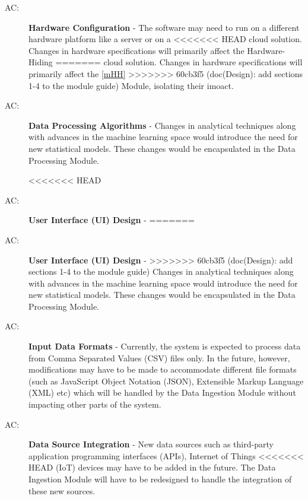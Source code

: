 \documentclass[12pt, titlepage]{article}
\newcounter{acnum}
\newcommand{\actheacnum}{AC\theacnum}
\begin{document}
\begin{description}
  \item[ \actheacnum \label{acHardware}:] \textbf{Hardware Configuration} - 
  The software may need to run on a different hardware platform like a server or on a 
<<<<<<< HEAD
  cloud solution. Changes in hardware specifications will primarily affect the Hardware-Hiding 
=======
  cloud solution. Changes in hardware specifications will primarily affect the \ref{mHH} 
>>>>>>> 60cb3f5 (doc(Design): add sections 1-4 to the module guide)
  Module, isolating their imoact.
  
  \item[ \actheacnum \label{acProcessing}:] \textbf{Data Processing Algorithms} - 
  Changes in analytical techniques along with advances in the machine learning space would
  introduce the need for new statistical models. These changes would be encapsulated in the
  Data Processing Module.

<<<<<<< HEAD
  \item[ \actheacnum \label{acInterface}:] \textbf{User Interface (UI) Design} - 
=======
  \item[ \actheacnum \label{acUI}:] \textbf{User Interface (UI) Design} - 
>>>>>>> 60cb3f5 (doc(Design): add sections 1-4 to the module guide)
  Changes in analytical techniques along with advances in the machine learning space would
  introduce the need for new statistical models. These changes would be encapsulated in the
  Data Processing Module.

  \item[ \actheacnum \label{acInput}:] \textbf{Input Data Formats} - 
  Currently, the system is expected to process data from Comma Separated Values (CSV) files only.
  In the future, however, modifications may have to be made to accommodate different file 
  formats (such as JavaScript Object Notation (JSON), Extensible Markup Language (XML) etc)
  which will be handled by the Data Ingestion Module without impacting other parts of the system.

  \item[ \actheacnum \label{acSource}:] \textbf{Data Source Integration} - 
  New data sources such as third-party application programming interfaces (APIs), Internet of Things
<<<<<<< HEAD
  (IoT) devices may have to be added in the future. The Data Ingestion Module will have to be 
  redesigned to handle the integration of these new sources.


\end{description}
\end{document}
